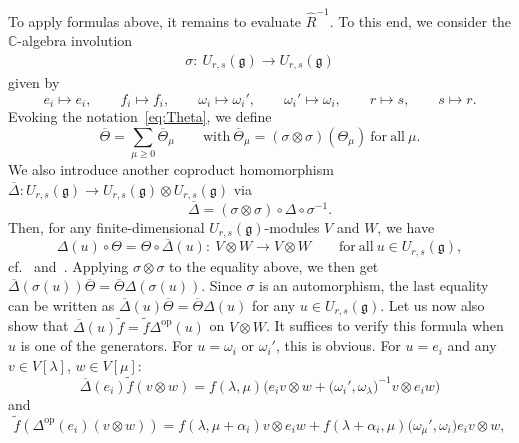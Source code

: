 \documentclass[pdftex]{sigma}
\numberwithin{equation}{section}
\DeclareMathOperator{\op}{op}
\newcommand{\fg}{\mathfrak{g}}
\newcommand{\BC}{\mathbb{C}}
\newcommand{\uu}{U_{r,s}(\fg)}
\begin{document}
To apply formulas above, it remains to evaluate $\hat{R}^{-1}$. To this end, we consider the $\BC$-algebra involution
\begin{gather}\label{eq:sigma-antiautom}
 \sigma\colon\ \uu \to \uu
\end{gather}
given by
\[
 e_i\mapsto e_i, \qquad f_i\mapsto f_i, \qquad \omega_{i}\mapsto \omega_{i}', \qquad
 \omega_{i}' \mapsto \omega_{i}, \qquad r\mapsto s, \qquad s\mapsto r.
\]
Evoking the notation~\eqref{eq:Theta}, we define
\begin{displaymath}
 \overline{\Theta} = \sum_{\mu\ge 0} \overline{\Theta}_{\mu} \qquad \mathrm{with} \
 \overline{\Theta}_{\mu} = (\sigma \otimes \sigma) (\Theta_{\mu}) \ \mathrm{for\ all} \ \mu.
\end{displaymath}
We also introduce another coproduct homomorphism $\overline{\Delta}\colon \uu \to \uu \otimes \uu$ via
\begin{displaymath}
 \overline{\Delta} = (\sigma \otimes \sigma) \circ \Delta \circ \sigma^{-1}.
\end{displaymath}
Then, for any finite-dimensional $\uu$-modules $V$ and $W$, we have
\begin{displaymath}
 \Delta(u) \circ \Theta = \Theta \circ \overline{\Delta}(u)\colon\ V \otimes W \to V \otimes W
 \qquad \mathrm{for\ all} \ u \in \uu,
\end{displaymath}
cf.\ \cite[Lemma~4.10]{BW1} and~\cite[Lemma~3.3]{BGH2}. Applying $\sigma \otimes \sigma$ to the equality above, we then get $\overline{\Delta}(\sigma(u)) \overline{\Theta} = \overline{\Theta} \Delta(\sigma(u))$. Since $\sigma$ is an automorphism, the last equality can be written as $\overline{\Delta}(u) \overline{\Theta} = \overline{\Theta}\Delta(u)$ for any $u\in \uu$. Let us now also show that $\overline{\Delta}(u) \widetilde{f} = \widetilde{f}\Delta^{\op}(u)$ on $V \otimes W$. It suffices to verify this formula when $u$ is one of the generators. For $u = \omega_{i}$ or $\omega_{i}'$, this is obvious. For $u = e_{i}$ and any $v \in V[\lambda]$, $w \in V[\mu]$:
\begin{displaymath}
 \overline{\Delta}(e_{i}) \widetilde{f} (v \otimes w) =
 f(\lambda,\mu) \bigl(e_{i}v \otimes w + \bigl(\omega_{i}',\omega_{\lambda}\bigr)^{-1} v \otimes e_{i}w\bigr)
\end{displaymath}
and
\begin{displaymath}
 \widetilde{f}(\Delta^{\op}(e_{i})(v \otimes w)) =
 f(\lambda,\mu + \alpha_{i})v \otimes e_{i}w + f(\lambda + \alpha_{i},\mu)\bigl(\omega_{\mu}',\omega_{i}\bigr) e_{i}v \otimes w,
\end{displaymath}
\end{document}
